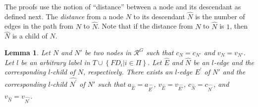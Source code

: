 \documentclass[11pt]{article}
\numberwithin{theorem}{section}
\newtheorem{lemma}[theorem]{Lemma}
\newcommand{\set}[1]{\left\{#1\right\}}
\begin{document}
The proofs use
the notion of ``distance'' between a node and its descendant as
defined next. The \emph{distance} from a node $N$ to its descendant
$\hat{N}$ is the number of edges in the path from $N$ to
$\hat{N}$. Note that if the distance from $N$ to $\hat{N}$ is $1$,
then $\hat{N}$ is a child of $N$.





\begin{lemma}\label{lem:sameConfigSameChild}
 Let $N$ and $N'$ be two nodes in $\mathcal{R}^{G}$ such that $c_N =
 c_{N'}$ and $v_N = v_{N'}$. Let $l$ be an arbitrary label in
 $T \cup \set{FD_i | i \in \Pi}$. Let  $\hat{E}$ and $\hat{N}$ be an $l$-edge and the
 corresponding $l$-child of $N$, respectively. There exists an
 $l$-edge $E^{\prime}$ of $N'$ and the corresponding $l$-child
 $\hat{N^{\prime}}$ of $N'$ such that $a_{\hat{E}} = a_{\hat{E^{\prime}}}$, $v_{\hat{E}} = v_{\hat{E'}}$,
 $c_{\hat{N}} = c_{\hat{N^{\prime}}}$, and $v_{\hat{N}} = v_{\hat{N^{\prime}}}$. 
\end{lemma}
\end{document}
